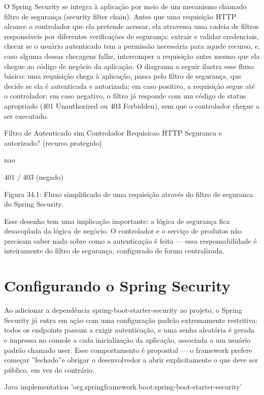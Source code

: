 O Spring Security se integra à aplicação por meio de um mecanismo chamado filtro de segurança (security filter chain). Antes que uma requisição HTTP alcance o controlador que ela pretende acessar, ela atravessa uma cadeia de filtros responsáveis por diferentes verificações de segurança: extrair e validar credenciais, checar se o usuário autenticado tem a permissão necessária para aquele recurso, e, caso alguma dessas checagens falhe, interromper a requisição antes mesmo que ela chegue ao código de negócio da aplicação. O diagrama a seguir ilustra esse fluxo básico: uma requisição chega à aplicação, passa pelo filtro de segurança, que decide se ela é autenticada e autorizada; em caso positivo, a requisição segue até o controlador; em caso negativo, o filtro já responde com um código de status apropriado (401 Unauthorized ou 403 Forbidden), sem que o controlador chegue a ser executado.

Filtro de Autenticado sim Controlador Requisicao HTTP Seguranca e autorizado? (recurso protegido)

nao

\begin{infobox}{401 / 403}
(negado)
\end{infobox}

Figura 34.1: Fluxo simplificado de uma requisição através do filtro de seguranca do Spring Security.

Esse desenho tem uma implicação importante: a lógica de segurança fica desacoplada da lógica de negócio. O controlador e o serviço de produtos não precisam saber nada sobre como a autenticação é feita — essa responsabilidade é inteiramente do filtro de segurança, configurado de forma centralizada.

\section{Configurando o Spring Security}

Ao adicionar a dependência spring-boot-starter-security ao projeto, o Spring Security já entra em ação com uma configuração padrão extremamente restritiva: todos os endpoints passam a exigir autenticação, e uma senha aleatória é gerada e impressa no console a cada inicialização da aplicação, associada a um usuário padrão chamado user. Esse comportamento é proposital — o framework prefere começar ”fechado”e obrigar o desenvolvedor a abrir explicitamente o que deve ser público, em vez do contrário.

\begin{codebox}{Java}
implementation 'org.springframework.boot:spring-boot-starter-security'
\end{codebox}

